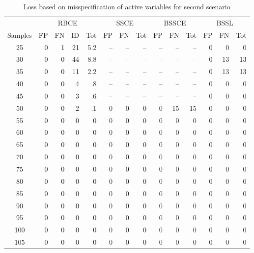 \documentclass[preprint,12pt]{elsarticle}
\begin{document}
\begin{table}
\small
\caption{Loss based on misspecification of active variables for second scenario}
\begin{tabular}{|c||rrr|r||rr|r||rr|r||rr|r|}
  \hline
  &\multicolumn{4}{c||}{RBCE}&\multicolumn{3}{c||}{SSCE}
  &\multicolumn{3}{c||}{BSSCE}&\multicolumn{3}{c|}{BSSL}\\
  \cline{2-14}
 Samples & FP & FN & ID & Tot & FP & FN & Tot & FP & FN & Tot & FP & FN & Tot \\ 
  \hline
25 &   0 &   1 &  21 & 5.2 & -- &  --  &  -- &  --  &  -- &  --  &   0 &   0 &   0\\ 
  30 &   0 &   0 &  44 & 8.8 & -- &  --  &  -- &  --  &  -- &  --  &  0 &  13 &   13\\ 
  35 &   0 &   0 &  11 & 2.2 & -- &  --  &  -- &  --  &  -- &  --  &  0 &  13 &   13\\ 
  40 &   0 &   0 &   4 & .8 & -- &  --  &  -- &  --  &  -- &  --  &   0 &   0 &   0\\ 
  45 &   0 &   0 &   3 & .6 & -- &  --  &  -- &  --  &  -- &  --  &   0 &   0 &   0\\ 
  50 &   0 &   0 &   2 & .1 &  0 &   0 &   0 &   0 &  15 & 15 &   0 &   0 &   0\\ 
  55 &   0 &   0 &   0 &  0 &   0 &   0 &   0 &   0 &   0 &   0 &   0&   0&   0\\ 
  60 &   0 &   0 &   0 &  0 &   0 &   0 &   0 &   0 &   0 &   0 &   0&   0&   0\\ 
  65 &   0 &   0 &   0 &  0 &   0 &   0 &   0 &   0 &   0 &   0 &   0&   0&   0\\ 
  70 &   0 &   0 &   0 &  0 &   0 &   0 &   0 &   0 &   0 &   0 &   0&   0&   0\\ 
  75 &   0 &   0 &   0 &  0 &   0 &   0 &   0 &   0 &   0 &   0 &   0&   0&   0\\ 
  80 &   0 &   0 &   0 &  0 &   0 &   0 &   0 &   0 &   0 &   0 &   0&   0&   0\\ 
  85 &   0 &   0 &   0 &  0 &   0 &   0 &   0 &   0 &   0 &   0 &   0&   0&   0\\ 
  90 &   0 &   0 &   0 &  0 &   0 &   0 &   0 &   0 &   0 &   0 &   0&   0&   0\\ 
  95 &   0 &   0 &   0 &  0 &   0 &   0 &   0 &   0 &   0 &   0 &   0&   0&   0\\ 
  100 &   0 &   0 &   0 &  0 &   0 &   0 &   0 &   0 &   0 &   0 &   0&   0&   0\\ 
  105 &   0 &   0 &   0 &  0 &   0 &   0 &   0 &   0 &   0 &   0 &   0&   0&   0\\ 

\end{tabular}
\end{table}
\end{document}
